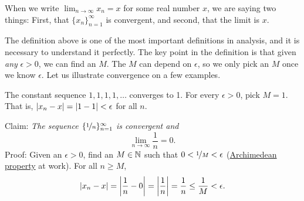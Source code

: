 \begin{myfigureht}
\caption{Illustration of convergence.
On top, we show the first ten points of the sequence as a graph
with $M$ and the interval around the limit $x$ marked.
On bottom, the points of the same sequence are marked on the
number line.\label{figsequenceconvergence}}
\end{myfigureht}

When we write $\lim_{n\to\infty} x_n = x$ for some real number $x$, we are saying two
things: First, that $\{ x_n \}_{n=1}^\infty$ is convergent, and second, that the limit is
$x$.

The definition above is one of the most important definitions in analysis,
and it is necessary to understand it perfectly.  The key point in the
definition is that given \emph{any} $\epsilon > 0$, we can find an $M$.  The
$M$ can depend on $\epsilon$, so we only pick an $M$ once we know
$\epsilon$.  Let us illustrate convergence on a few examples.

\begin{example}
The constant sequence $1,1,1,1,\ldots$ converges to 1.  For
every $\epsilon > 0$, pick $M = 1$.  That is, $\lvert {x_n-x} \rvert = \lvert {1-1} \rvert < \epsilon$ for all $n$.
\end{example}

\begin{example}
Claim: \emph{The sequence $\{ \nicefrac{1}{n} \}_{n=1}^\infty$ is convergent and}
\begin{equation*}
\lim_{n\to \infty} \frac{1}{n} = 0 .
\end{equation*}
Proof: Given an $\epsilon > 0$, find an $M \in {\mathbb{N}}$ such that
$0 < \nicefrac{1}{M} < \epsilon$
(\hyperref[thm:arch:i]{Archimedean property} at work).
For all $n \geq M$,
\begin{equation*}
\lvert {x_n - x} \rvert
=
\left\lvert {\frac{1}{n} - 0} \right\rvert = \left\lvert {\frac{1}{n}} \right\rvert = \frac{1}{n} \leq \frac{1}{M} < \epsilon .
\end{equation*}
\end{example}

